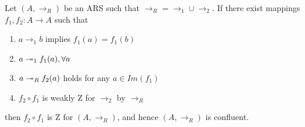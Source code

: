     \begin{corollary}\cite{Nakazawa-Fujita2016}\label{cor:zcomp} Let
     $(A,\to_R)$ be an ARS such that $\to_R = \to_1 \cup \to_2$. If
     there exist mappings $f_1,f_2: A \to A$ such that
     \begin{enumerate} \item $a \to_1 b$ implies $f_1(a) = f_1(b)$
     \item $a \twoheadrightarrow_1 f_1(a), \forall a$ \item $a \twoheadrightarrow_R f_2(a)$ holds
     for any $a\in Im(f_1)$ \item $f_2 \circ f_1$ is weakly Z for
     $\to_2$ by $\to_R$ \end{enumerate} then $f_2 \circ f_1$ is Z for
     $(A,\to_R)$, and hence $(A,\to_R)$ is confluent. \end{corollary}


